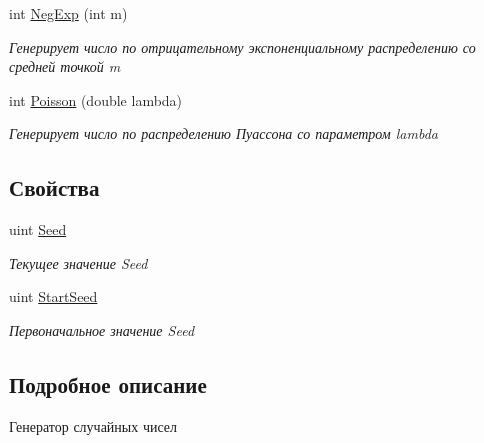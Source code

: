 \begin{DoxyCompactItemize}
int \hyperlink{class_s_m_p_l_sharp_1_1_utils_1_1_smpl_random_generator_ada324a6e67bc2efe383ac8747786cacd}{Neg\-Exp} (int m)
\begin{DoxyCompactList}\small\item\em Генерирует число по отрицательному экспоненциальному распределению со средней точкой m \end{DoxyCompactList}\item 
int \hyperlink{class_s_m_p_l_sharp_1_1_utils_1_1_smpl_random_generator_af9c5a792d8012238970623e06ccca615}{Poisson} (double lambda)
\begin{DoxyCompactList}\small\item\em Генерирует число по распределению Пуассона со параметром lambda \end{DoxyCompactList}\end{DoxyCompactItemize}
\subsection*{Свойства}
\begin{DoxyCompactItemize}
\item 
uint \hyperlink{class_s_m_p_l_sharp_1_1_utils_1_1_smpl_random_generator_a504f2e98704d7f18cfacc0d36be02eaf}{Seed}
\begin{DoxyCompactList}\small\item\em Текущее значение Seed \end{DoxyCompactList}\item 
uint \hyperlink{class_s_m_p_l_sharp_1_1_utils_1_1_smpl_random_generator_a87ae75f71d8390f0980feef6e82b7d87}{Start\-Seed}
\begin{DoxyCompactList}\small\item\em Первоначальное значение Seed \end{DoxyCompactList}\end{DoxyCompactItemize}


\subsection{Подробное описание}
Генератор случайных чисел 



